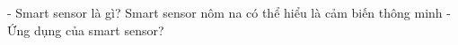 - Smart sensor là gì? Smart sensor nôm na có thể hiểu là cảm biến thông minh
- Ứng dụng của smart sensor? 